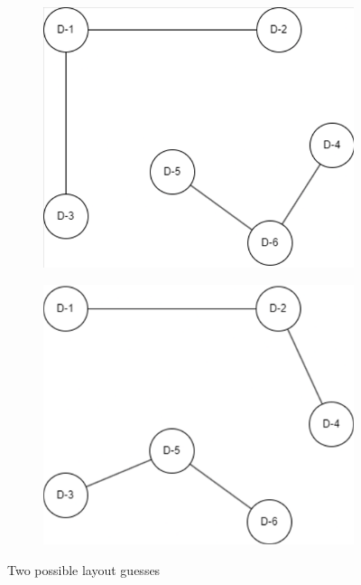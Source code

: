 \begin{figure}[htbp]
    \centering
    \begin{subfigure}[b]{0.38\textwidth}
        \centering
        \includegraphics[width=\textwidth]{images/layoutguess1.png}
    \end{subfigure}
    \hfill
    \begin{subfigure}[b]{0.38\textwidth}
        \centering
        \includegraphics[width=\textwidth]{images/layoutguess2.png}
    \end{subfigure}
    \caption{Two possible layout guesses}
    \label{fig:layoutguesses}
\end{figure}

